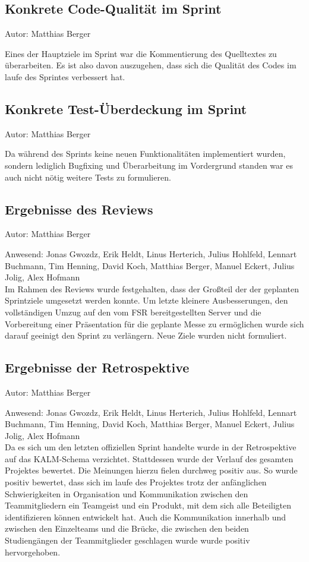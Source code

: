 \subsection{Konkrete Code-Qualität im Sprint}
{\small Autor: Matthias Berger}

Eines der Hauptziele im Sprint war die Kommentierung des Quelltextes zu überarbeiten. Es ist also davon auszugehen, dass sich die Qualität des Codes im laufe des Sprintes verbessert hat.

\subsection{Konkrete Test-Überdeckung im Sprint}
{\small Autor: Matthias Berger}

Da während des Sprints keine neuen Funktionalitäten implementiert wurden, sondern lediglich Bugfixing und Überarbeitung  im Vordergrund standen war es auch nicht nötig weitere Tests zu formulieren.

\subsection{Ergebnisse des Reviews}
{\small Autor: Matthias Berger}

Anwesend: Jonas Gwozdz, Erik Heldt, Linus Herterich, Julius Hohlfeld, Lennart Buchmann, Tim Henning, David Koch, Matthias Berger, Manuel Eckert, Julius Jolig, Alex Hofmann\\

Im Rahmen des Reviews wurde festgehalten, dass der Großteil der der geplanten  Sprintziele umgesetzt werden konnte. Um letzte kleinere Ausbesserungen, den vollständigen Umzug auf den vom FSR bereitgestellten Server und die Vorbereitung einer Präsentation für die geplante Messe zu ermöglichen wurde sich darauf geeinigt den Sprint zu verlängern. Neue Ziele wurden nicht formuliert.

\subsection{Ergebnisse der Retrospektive}
{\small Autor: Matthias Berger}

Anwesend: Jonas Gwozdz, Erik Heldt, Linus Herterich, Julius Hohlfeld, Lennart Buchmann, Tim Henning, David Koch, Matthias Berger, Manuel Eckert, Julius Jolig, Alex Hofmann\\

Da es sich um den letzten offiziellen Sprint handelte wurde in der Retrospektive auf das KALM-Schema verzichtet. Stattdessen wurde der Verlauf des gesamten Projektes bewertet. Die Meinungen hierzu fielen durchweg positiv aus. So wurde  positiv bewertet, dass sich im laufe des Projektes trotz der anfänglichen Schwierigkeiten in Organisation und Kommunikation zwischen den Teammitgliedern ein Teamgeist und ein Produkt, mit dem sich alle Beteiligten identifizieren können entwickelt hat. Auch die Kommunikation innerhalb und zwischen den Einzelteams und die Brücke, die zwischen den beiden Studiengängen der Teammitglieder geschlagen wurde wurde positiv hervorgehoben.

